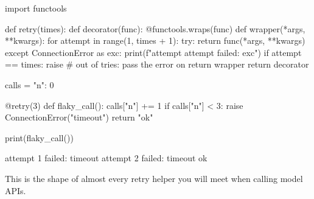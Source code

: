 \begin{center}
\end{center}

\begin{pycode}
import functools

def retry(times):
    def decorator(func):
        @functools.wraps(func)
        def wrapper(*args, **kwargs):
            for attempt in range(1, times + 1):
                try:
                    return func(*args, **kwargs)
                except ConnectionError as exc:
                    print(f"attempt {attempt} failed: {exc}")
                    if attempt == times:
                        raise              # out of tries: pass the error on
        return wrapper
    return decorator

calls = {"n": 0}

@retry(3)
def flaky_call():
    calls["n"] += 1
    if calls["n"] < 3:
        raise ConnectionError("timeout")
    return "ok"

print(flaky_call())
\end{pycode}
\begin{rawcode}
attempt 1 failed: timeout
attempt 2 failed: timeout
ok
\end{rawcode}

This is the shape of almost every retry helper you will meet when calling model APIs.

